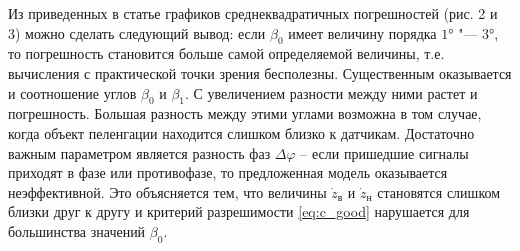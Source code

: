 \documentclass[../main.tex]{subfiles}
\begin{document}
Из приведенных в статье графиков среднеквадратичных погрешностей (рис. 2 и 3) можно сделать следующий вывод: если $\beta_0$ имеет величину порядка $\ang{1}$ "--- $\ang{3}$, то погрешность становится больше самой определяемой величины, т.е. вычисления с практической точки зрения бесполезны. Существенным оказывается и соотношение углов $\beta_0$ и $\beta_1$. С увеличением разности между ними растет и погрешность. Большая разность между этими углами возможна в том случае, когда объект пеленгации находится слишком близко к датчикам. Достаточно важным параметром является разность фаз $\Delta \varphi$ – если пришедшие сигналы приходят в фазе или противофазе, то предложенная модель оказывается неэффективной. Это объясняется тем, что величины $\dot{z}_\text{в}$ и $\dot{z}_\text{н}$ становятся слишком близки друг к другу и критерий разрешимости \eqref{eq:c_good} нарушается для большинства значений $\beta_0$.
\end{document}
